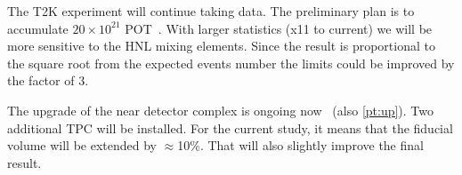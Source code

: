 \documentclass[../main.tex]{subfiles}
\begin{document}
The T2K experiment will continue taking data. The preliminary plan is to accumulate $20\times10^{21}$ POT~\cite{Abe2016e}. With larger statistics (x11 to current) we will be more sensitive to the HNL mixing elements. Since the result is proportional to the square root from the expected events number the limits could be improved by the factor of 3.

The upgrade of the near detector complex is ongoing now~\cite{Abe2019} (also \autoref{pt:up}). Two additional TPC will be installed. For the current study, it means that the fiducial volume will be extended by $\approx$10\%. That will also slightly improve the final result.
\end{document}
